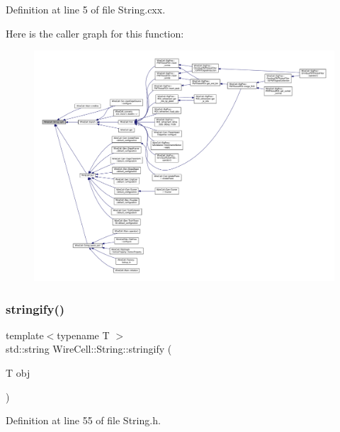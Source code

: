 Definition at line 5 of file String.\+cxx.

Here is the caller graph for this function\+:
\nopagebreak
\begin{figure}[H]
\begin{center}
\leavevmode
\includegraphics[width=350pt]{namespace_wire_cell_1_1_string_aef23d7b89dbe21e34a499c9156dd1e60_icgraph}
\end{center}
\end{figure}
\mbox{\label{namespace_wire_cell_1_1_string_a7aac9b5f4bf607e959ff98125287ab2a}} 
\subsubsection{\texorpdfstring{stringify()}{stringify()}}
{\footnotesize\ttfamily template$<$typename T $>$ \\
std\+::string Wire\+Cell\+::\+String\+::stringify (\begin{DoxyParamCaption}\item[{T}]{obj }\end{DoxyParamCaption})}



Definition at line 55 of file String.\+h.


